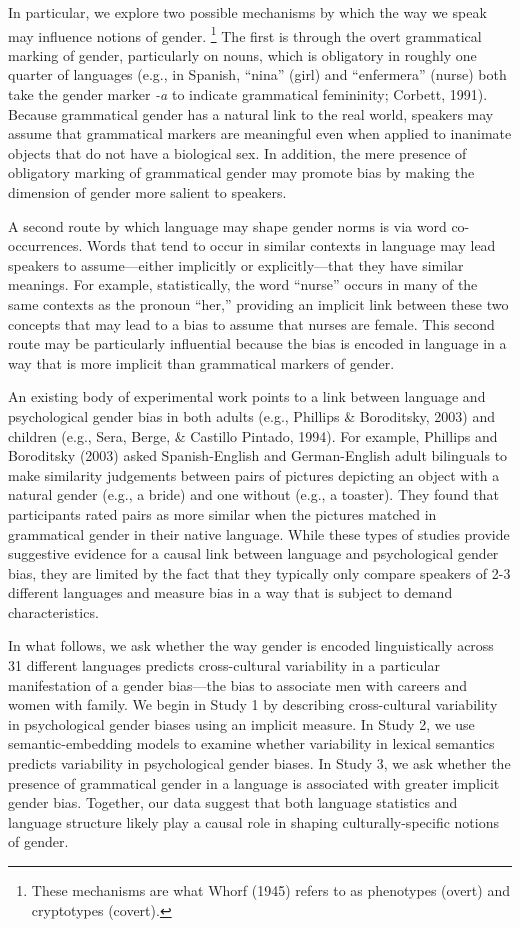 \documentclass[10pt, letterpaper]{article}
\begin{document}
In particular, we explore two possible mechanisms by which the way we
speak may influence notions of gender.
\footnote{These mechanisms are what Whorf (1945) refers to as phenotypes (overt) and cryptotypes (covert).}
The first is through the overt grammatical marking of gender,
particularly on nouns, which is obligatory in roughly one quarter of
languages (e.g., in Spanish, ``nina'' (girl) and ``enfermera'' (nurse)
both take the gender marker \emph{-a} to indicate grammatical
femininity; Corbett, 1991). Because grammatical gender has a natural
link to the real world, speakers may assume that grammatical markers are
meaningful even when applied to inanimate objects that do not have a
biological sex. In addition, the mere presence of obligatory marking of
grammatical gender may promote bias by making the dimension of gender
more salient to speakers.

A second route by which language may shape gender norms is via word
co-occurrences. Words that tend to occur in similar contexts in language
may lead speakers to assume---either implicitly or explicitly---that
they have similar meanings. For example, statistically, the word
``nurse'' occurs in many of the same contexts as the pronoun ``her,''
providing an implicit link between these two concepts that may lead to a
bias to assume that nurses are female. This second route may be
particularly influential because the bias is encoded in language in a
way that is more implicit than grammatical markers of gender.

An existing body of experimental work points to a link between language
and psychological gender bias in both adults (e.g., Phillips \&
Boroditsky, 2003) and children (e.g., Sera, Berge, \& Castillo Pintado,
1994). For example, Phillips and Boroditsky (2003) asked Spanish-English
and German-English adult bilinguals to make similarity judgements
between pairs of pictures depicting an object with a natural gender
(e.g., a bride) and one without (e.g., a toaster). They found that
participants rated pairs as more similar when the pictures matched in
grammatical gender in their native language. While these types of
studies provide suggestive evidence for a causal link between language
and psychological gender bias, they are limited by the fact that they
typically only compare speakers of 2-3 different languages and measure
bias in a way that is subject to demand characteristics.

In what follows, we ask whether the way gender is encoded linguistically
across 31 different languages predicts cross-cultural variability in a
particular manifestation of a gender bias---the bias to associate men
with careers and women with family. We begin in Study 1 by describing
cross-cultural variability in psychological gender biases using an
implicit measure. In Study 2, we use semantic-embedding models to
examine whether variability in lexical semantics predicts variability in
psychological gender biases. In Study 3, we ask whether the presence of
grammatical gender in a language is associated with greater implicit
gender bias. Together, our data suggest that both language statistics
and language structure likely play a causal role in shaping
culturally-specific notions of gender.
\end{document}
